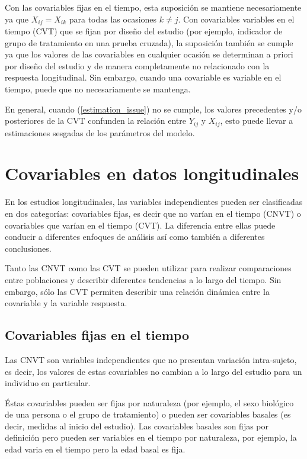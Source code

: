 \documentclass[spanish]{article}
\numberwithin{figure}{subsection}
\numberwithin{equation}{subsection}
\numberwithin{table}{subsection}
\begin{document}
Con las covariables fijas en el tiempo, esta suposición se mantiene
necesariamente ya que $X_{ij} = X_{ik}$ para todas las ocasiones $k \neq j$. Con
covariables variables en el tiempo (CVT) que se fijan por diseño del estudio
(por ejemplo, indicador de grupo de tratamiento en una prueba cruzada), la
suposición también se cumple ya que los valores de las covariables en cualquier
ocasión se determinan a priori por diseño del estudio y de manera completamente
no relacionado con la respuesta longitudinal. Sin embargo, cuando una covariable
es variable en el tiempo, puede que no necesariamente se mantenga.

En general, cuando (\ref{estimation_issue}) no se cumple, los valores
precedentes y/o posteriores de la CVT confunden la relación entre $Y_{ij}$ y
$X_{ij}$, esto puede llevar a estimaciones sesgadas de los parámetros del
modelo.

\newpage

\section{Covariables en datos longitudinales}


En los estudios longitudinales, las variables independientes pueden ser
clasificadas en dos categorías: covariables fijas, es decir que no varían en el
tiempo (CNVT) o covariables que varían en el tiempo (CVT). La diferencia entre
ellas puede conducir a diferentes enfoques de análisis así como también a
diferentes conclusiones.

Tanto las CNVT como las CVT se pueden utilizar para realizar comparaciones entre
poblaciones y describir diferentes tendencias a lo largo del tiempo. Sin
embargo, sólo las CVT permiten describir una relación dinámica entre la
covariable y la variable respuesta.

\subsection{Covariables fijas en el tiempo}

Las CNVT son variables independientes que no presentan variación intra-sujeto,
es decir, los valores de estas covariables no cambian a lo largo del estudio
para un individuo en particular.

Éstas covariables pueden ser fijas por naturaleza (por ejemplo, el sexo
biológico de una persona o el grupo de tratamiento) o pueden ser covariables
basales (es decir, medidas al inicio del estudio). Las covariables basales son
fijas por definición pero pueden ser variables en el tiempo por naturaleza, por
ejemplo, la edad varia en el tiempo pero la edad basal es fija.
\end{document}
